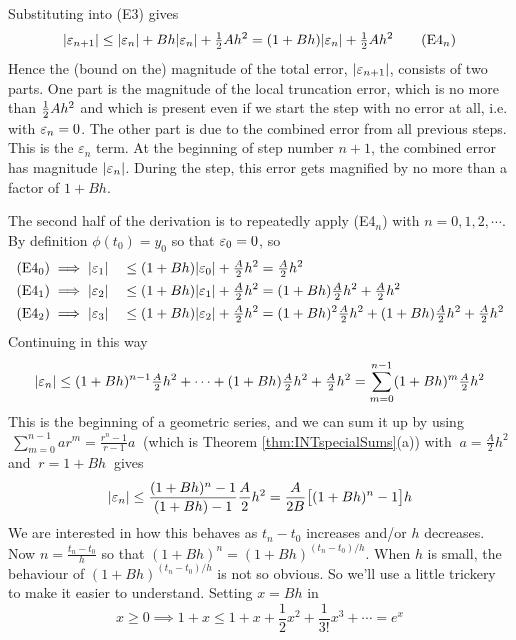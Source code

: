 Substituting into (E3) gives
\begin{equation*}
|\varepsilon_{n+1}|
\le |\varepsilon_n| + Bh|\varepsilon_n| +\tfrac{1}{2} Ah^2
= (1+Bh)|\varepsilon_n| +\tfrac{1}{2} Ah^2
\tag{E4$_n$}
\end{equation*}
Hence the (bound on the) magnitude of the total error, $|\varepsilon_{n+1}|$, consists of two parts. 
One part is the magnitude of the local truncation error, which is no more 
than $\tfrac{1}{2} Ah^2$ and which is present even if we start the step with no 
error at all, i.e. with $\varepsilon_n=0$.
The other part is due to the combined error from all previous steps.
This is the $\varepsilon_n$ term.
At the beginning of step number $n+1$, the combined error has magnitude
$|\varepsilon_n|$. During the step, this error gets magnified by no more 
than a factor of $1+Bh$.

The second half of the derivation is to repeatedly apply (E4$_n$) with
$n=0,1,2,\cdots$. By definition $\phi(t_0)=y_0$ so that $\varepsilon_0=0$, so
\begin{alignat*}{3}
&(\text{E4}_0)\implies|\varepsilon_1|&&\le (1+Bh)|\varepsilon_0| +\tfrac{A}{2}h^2
                        =\tfrac{A}{2} h^2 \\
&(\text{E4}_1)\implies|\varepsilon_2|&&\le (1+Bh)|\varepsilon_1| +\tfrac{A}{2} h^2
                               =(1+Bh)\tfrac{A}{2}h^2+\tfrac{A}{2}h^2 \\
&(\text{E4}_2)\implies|\varepsilon_3|&&\le (1+Bh)|\varepsilon_2| +\tfrac{A}{2}h^2
              =(1+Bh)^2\tfrac{A}{2}h^2+(1+Bh)\tfrac{A}{2}h^2+\tfrac{A}{2}h^2
\end{alignat*}
Continuing in this way 
\begin{equation*}
|\varepsilon_n|\le 
       (1+Bh)^{n-1}\tfrac{A}{2}h^2+\cdots+(1+Bh)\tfrac{A}{2}h^2+\tfrac{A}{2}h^2
=\sum_{m=0}^{n-1} (1+Bh)^m \tfrac{A}{2}h^2
\end{equation*}
This is the beginning of a geometric series, and we can sum it up by using 
$\ \sum\limits_{m=0}^{n-1} ar^m=\frac{r^n-1}{r-1}a\ $ (which is Theorem
\ref{thm:INTspecialSums}(a))
with $\ a=\tfrac{A}{2}h^2\ $ and $\ r=1+Bh\ $ gives
\begin{equation*}
|\varepsilon_n|\le \frac{(1+Bh)^n-1}{(1+Bh)-1}\frac{A}{2}h^2
=\frac{A}{2B}\big[(1+Bh)^n-1\big]h
\end{equation*}
We are interested in how this behaves as $t_n-t_0$ increases and/or $h$ decreases. Now $n=\frac{t_n-t_0}{h}$ so that $(1+Bh)^n=(1+Bh)^{(t_n-t_0)/h}$. When $h$ is small, the behaviour of $(1+Bh)^{(t_n-t_0)/h}$ is not so obvious. So we'll use a little trickery to make it easier to understand. Setting $x=Bh$ in 
\begin{equation*}
x\ge 0\implies 1+x\le 1+x+\frac{1}{2}x^2+\frac{1}{3!}x^3+\cdots = e^x
\end{equation*}
